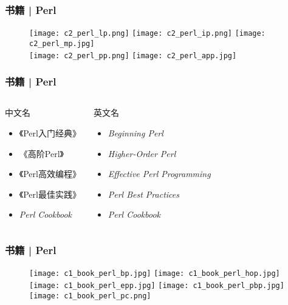 \begin{frame}
  \frametitle{书籍 | Perl}
  \begin{figure}
    \centering
    \texttt{[image: c2\_perl\_lp.png]}
    \qquad
    \texttt{[image: c2\_perl\_ip.png]}
    \qquad
    \texttt{[image: c2\_perl\_mp.jpg]}\\
    \texttt{[image: c2\_perl\_pp.png]}
    \hspace{2cm}
    \texttt{[image: c2\_perl\_app.jpg]}
  \end{figure}
\end{frame}

\begin{frame}
  \frametitle{书籍 | Perl}
  \begin{columns}
  \begin{block}{中文名}
    \begin{itemize}
      \item 《Perl入门经典》
      \item 《高阶Perl》
      \item 《Perl高效编程》
      \item 《Perl最佳实践》
      \item \textit{Perl Cookbook}
    \end{itemize}
  \end{block}
  \begin{block}{英文名}
    \begin{itemize}
      \item \textit{Beginning Perl}
      \item \textit{Higher-Order Perl}
      \item \textit{Effective Perl Programming}
      \item \textit{Perl Best Practices}
      \item \textit{Perl Cookbook}
    \end{itemize}
  \end{block}
\end{columns}
\end{frame}

\begin{frame}
  \frametitle{书籍 | Perl}
  \begin{figure}
    \centering
    \texttt{[image: c1\_book\_perl\_bp.jpg]}\qquad
    \texttt{[image: c1\_book\_perl\_hop.jpg]}\\
    \texttt{[image: c1\_book\_perl\_epp.jpg]}\quad
    \texttt{[image: c1\_book\_perl\_pbp.jpg]}\quad
    \texttt{[image: c1\_book\_perl\_pc.png]}
  \end{figure}
\end{frame}

